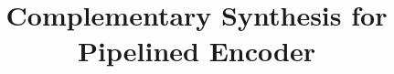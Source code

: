 \documentclass[conference]{IEEEtran}
\begin{document}
%
\title{Complementary Synthesis for Pipelined Encoder}




% 
\end{document}

